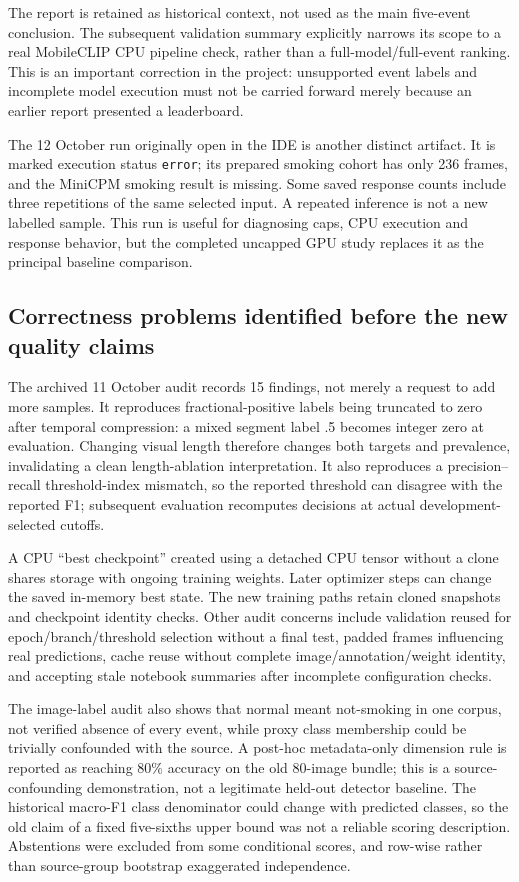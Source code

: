 The report is retained as historical context, not used as the main five-event conclusion. The subsequent validation summary explicitly narrows its scope to a real MobileCLIP CPU pipeline check, rather than a full-model/full-event ranking. This is an important correction in the project: unsupported event labels and incomplete model execution must not be carried forward merely because an earlier report presented a leaderboard.

The 12 October run originally open in the IDE is another distinct artifact. It is marked execution status \texttt{error}; its prepared smoking cohort has only 236 frames, and the MiniCPM smoking result is missing. Some saved response counts include three repetitions of the same selected input. A repeated inference is not a new labelled sample. This run is useful for diagnosing caps, CPU execution and response behavior, but the completed uncapped GPU study replaces it as the principal baseline comparison.

\subsection{Correctness problems identified before the new quality claims}
The archived 11 October audit records 15 findings, not merely a request to add more samples. It reproduces fractional-positive labels being truncated to zero after temporal compression: a mixed segment label .5 becomes integer zero at evaluation. Changing visual length therefore changes both targets and prevalence, invalidating a clean length-ablation interpretation. It also reproduces a precision--recall threshold-index mismatch, so the reported threshold can disagree with the reported F1; subsequent evaluation recomputes decisions at actual development-selected cutoffs.

A CPU ``best checkpoint'' created using a detached CPU tensor without a clone shares storage with ongoing training weights. Later optimizer steps can change the saved in-memory best state. The new training paths retain cloned snapshots and checkpoint identity checks. Other audit concerns include validation reused for epoch/branch/threshold selection without a final test, padded frames influencing real predictions, cache reuse without complete image/annotation/weight identity, and accepting stale notebook summaries after incomplete configuration checks.

The image-label audit also shows that normal meant not-smoking in one corpus, not verified absence of every event, while proxy class membership could be trivially confounded with the source. A post-hoc metadata-only dimension rule is reported as reaching 80\% accuracy on the old 80-image bundle; this is a source-confounding demonstration, not a legitimate held-out detector baseline. The historical macro-F1 class denominator could change with predicted classes, so the old claim of a fixed five-sixths upper bound was not a reliable scoring description. Abstentions were excluded from some conditional scores, and row-wise rather than source-group bootstrap exaggerated independence.

